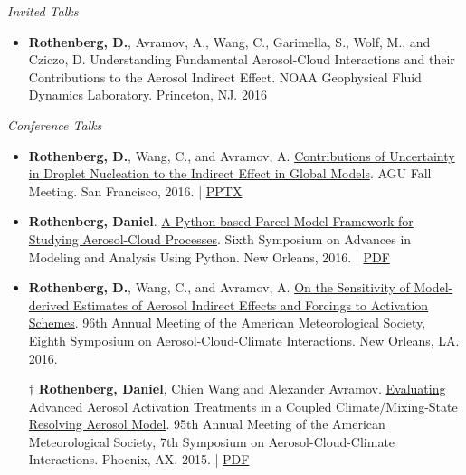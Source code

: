 \documentclass[11pt,letterpaper]{article}
\begin{document}
\emph{Invited Talks}
\medskip
\begin{itemize}[itemindent=-10pt]
\item \textbf{Rothenberg, D.}, Avramov, A., Wang, C., Garimella, S., Wolf, M., and Cziczo, D. Understanding Fundamental Aerosol-Cloud Interactions and their Contributions to the Aerosol Indirect Effect. NOAA Geophysical Fluid Dynamics Laboratory. Princeton, NJ. 2016
\end{itemize}

\bigskip
\emph{Conference Talks}
\medskip
\begin{itemize}[itemindent=-10pt]

 \item \textbf{Rothenberg, D.}, Wang, C., and Avramov, A.
 \href{https://agu.confex.com/agu/fm16/meetingapp.cgi/Paper/193282}{Contributions of Uncertainty in Droplet Nucleation to the Indirect Effect in Global Models}. AGU Fall Meeting. San Francisco, 2016. | \href{https://figshare.com/articles/Contributions_of_Uncertainty_in_Droplet_Nucleation_to_the_Indirect_Effect_in_Global_Models/4503047}{PPTX}

 \item \textbf{Rothenberg, Daniel}. \href{https://ams.confex.com/ams/96Annual/webprogram/Paper286193.html}{A Python-based Parcel Model Framework for Studying Aerosol-Cloud Processes}. Sixth Symposium on Advances in Modeling and Analysis Using Python. New Orleans, 2016. | \href{https://figshare.com/articles/A_Python-based_Parcel_Model_Framework_for_Studying_Aerosol-Cloud_Processes/3475241}{PDF}

 \item \textbf{Rothenberg, D.}, Wang, C., and Avramov, A. \href{https://ams.confex.com/ams/96Annual/webprogram/Paper289914.html}{On the Sensitivity of Model-derived Estimates of Aerosol Indirect Effects and Forcings to Activation Schemes}. 96th Annual Meeting of the American Meteorological Society, Eighth Symposium on Aerosol-Cloud-Climate Interactions. New Orleans, LA. 2016.

 \item[$\dagger$] \textbf{Rothenberg, Daniel}, Chien Wang and Alexander Avramov. \href{https://ams.confex.com/ams/95Annual/webprogram/Paper268747.html}{Evaluating Advanced Aerosol Activation Treatments in a Coupled Climate/Mixing-State Resolving Aerosol Model}. 95th Annual Meeting of the American Meteorological Society, 7th Symposium on Aerosol-Cloud-Climate Interactions. Phoenix, AX. 2015. | \href{https://figshare.com/articles/Evaluating_Advanced_Aerosol_Activation_Treatments_in_a_Coupled_Climate_Mixing-State_Resolving_Aerosol_Model/3475226}{PDF}


\end{itemize}
\end{document}
